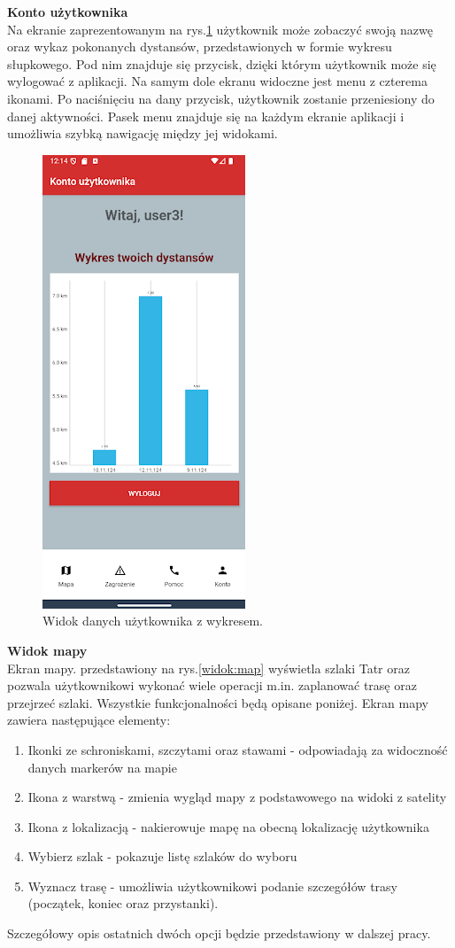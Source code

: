 \textbf{Konto użytkownika} \\
Na ekranie zaprezentowanym na rys.\ref{widok:user} użytkownik może zobaczyć swoją nazwę oraz wykaz pokonanych dystansów, przedstawionych w formie wykresu słupkowego. Pod nim znajduje się przycisk, dzięki którym użytkownik może się wylogować z aplikacji. Na samym dole ekranu widoczne jest menu z czterema ikonami. Po naciśnięciu na dany przycisk, użytkownik zostanie przeniesiony do danej aktywności. Pasek menu znajduje się na każdym ekranie aplikacji i umożliwia szybką nawigację między jej widokami.\\
\begin{figure}[H]
    \centering
    \includegraphics[scale=0.70]{img/imp/widok-user.png}
    \caption{Widok danych użytkownika z wykresem.}
    \label{widok:user}
\end{figure}

\textbf{Widok mapy} \\
Ekran mapy. przedstawiony na rys.\ref{widok:map} wyświetla szlaki Tatr oraz pozwala użytkownikowi wykonać wiele operacji m.in. zaplanować trasę oraz przejrzeć szlaki. Wszystkie funkcjonalności będą opisane poniżej.
Ekran mapy zawiera następujące elementy:
\begin{enumerate}
    \item Ikonki ze schroniskami, szczytami oraz stawami - odpowiadają za widoczność  danych markerów na mapie
    \item Ikona z warstwą - zmienia wygląd mapy z podstawowego na widoki z satelity
    \item Ikona z lokalizacją - nakierowuje mapę na obecną lokalizację użytkownika
    \item Wybierz szlak - pokazuje listę szlaków do wyboru
    \item Wyznacz trasę - umożliwia użytkownikowi podanie szczegółów trasy (początek, koniec oraz przystanki).
\end{enumerate}
Szczegółowy opis ostatnich dwóch opcji będzie przedstawiony w dalszej pracy.


